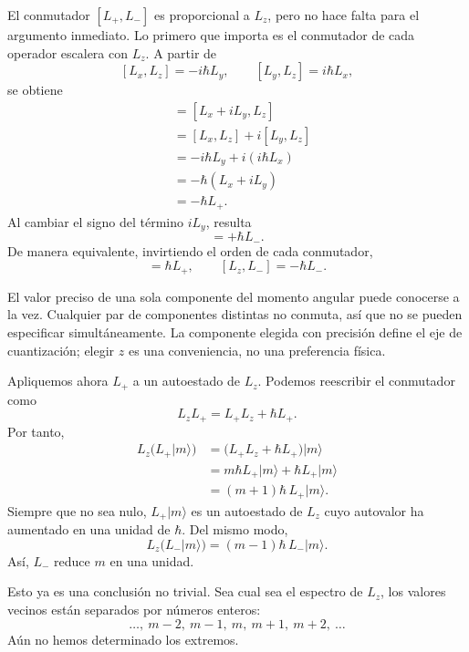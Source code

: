 El conmutador \([L_+,L_-]\) es proporcional a \(L_z\), pero no hace falta para el argumento inmediato. Lo primero que importa es el conmutador de cada operador escalera con \(L_z\). A partir de
\[
[L_x,L_z]=-i\hbar L_y,
\qquad
[L_y,L_z]=i\hbar L_x,
\]
se obtiene
\begin{align}
[L_+,L_z]
&=[L_x+iL_y,L_z] \\
&=[L_x,L_z]+i[L_y,L_z] \\
&=-i\hbar L_y+i(i\hbar L_x) \\
&=-\hbar(L_x+iL_y) \\
&=-\hbar L_+.
\end{align}
Al cambiar el signo del término \(iL_y\), resulta
\begin{equation}
[L_-,L_z]=+\hbar L_-.
\end{equation}
De manera equivalente, invirtiendo el orden de cada conmutador,
\begin{equation}
[L_z,L_+]=\hbar L_+,
\qquad
[L_z,L_-]=-\hbar L_-.
\end{equation}

El valor preciso de una sola componente del momento angular puede conocerse a la vez. Cualquier par de componentes distintas no conmuta, así que no se pueden especificar simultáneamente. La componente elegida con precisión define el eje de cuantización; elegir \(z\) es una conveniencia, no una preferencia física.

Apliquemos ahora \(L_+\) a un autoestado de \(L_z\). Podemos reescribir el conmutador como
\begin{equation}
L_zL_+=L_+L_z+\hbar L_+.
\end{equation}
Por tanto,
\begin{align}
L_z\bigl(L_+\lvert m\rangle\bigr)
&=\bigl(L_+L_z+\hbar L_+\bigr)\lvert m\rangle \\
&=m\hbar L_+\lvert m\rangle+\hbar L_+\lvert m\rangle \\
&=(m+1)\hbar\,L_+\lvert m\rangle.
\end{align}
Siempre que no sea nulo, \(L_+\lvert m\rangle\) es un autoestado de \(L_z\) cuyo autovalor ha aumentado en una unidad de \(\hbar\). Del mismo modo,
\begin{equation}
L_z\bigl(L_-\lvert m\rangle\bigr)
=(m-1)\hbar\,L_-\lvert m\rangle.
\end{equation}
Así, \(L_-\) reduce \(m\) en una unidad.

Esto ya es una conclusión no trivial. Sea cual sea el espectro de \(L_z\), los valores vecinos están separados por números enteros:
\begin{equation}
\ldots,\ m-2,\ m-1,\ m,\ m+1,\ m+2,\ \ldots
\end{equation}
Aún no hemos determinado los extremos.

